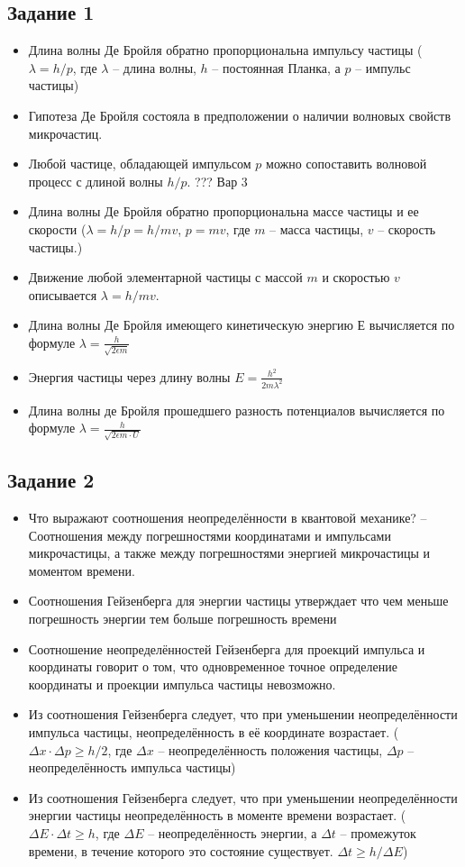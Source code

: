 \documentclass[../main.tex]{subfiles}
\begin{document}
\subsection{Задание 1}
\begin{itemize}
    \item Длина волны Де Бройля обратно пропорциональна импульсу частицы ($\lambda = h/p$, где $\lambda$ -- длина волны, $h$ -- постоянная Планка, а $p$ -- импульс частицы)
    \item Гипотеза Де Бройля состояла в предположении о наличии волновых свойств микрочастиц.
    \item Любой частице, обладающей импульсом $p$ можно сопоставить волновой процесс с длиной волны $h/p$. ??? Вар 3
    \item Длина волны Де Бройля обратно пропорциональна массе частицы и ее скорости ($\lambda = h/p = h/mv$, $p = mv$, где $m$ -- масса частицы, $v$ -- скорость частицы.)
    \item Движение любой элементарной частицы с массой $m$ и скоростью $v$ описывается $\lambda = h/mv$.
    \item Длина волны Де Бройля имеющего кинетическую энергию Е вычисляется по формуле $\lambda = \frac{h}{\sqrt{2 \epsilon m}}$
    \item Энергия частицы через длину волны $E = \frac{h^2}{2m \lambda^2}$
    \item Длина волны де Бройля прошедшего разность потенциалов вычисляется по формуле $\lambda = \frac{h}{\sqrt{2 \epsilon m \cdot U}}$
\end{itemize}

\subsection{Задание 2}
\begin{itemize}
    \item Что выражают соотношения неопределённости в квантовой механике? -- Соотношения между погрешностями координатами и импульсами микрочастицы, а также между погрешностями энергией микрочастицы и моментом времени.
    \item Соотношения Гейзенберга для энергии частицы утверждает что чем меньше погрешность энергии тем больше погрешность времени
    \item Соотношение неопределённостей Гейзенберга для проекций импульса и координаты говорит о том, что одновременное точное определение координаты и проекции импульса частицы невозможно.
    \item Из соотношения Гейзенберга следует, что при уменьшении неопределённости импульса частицы, неопределённость в её координате возрастает. ($\Delta x \cdot \Delta p \ge h/2$, где $\Delta x$ -- неопределённость положения частицы, $\Delta p$ -- неопределённость импульса частицы)
    \item Из соотношения Гейзенберга следует, что при уменьшении неопределённости энергии частицы неопределённость в моменте времени возрастает. ($\Delta E \cdot \Delta t \ge h$, где $\Delta E$ -- неопределённость энергии, а $\Delta t$ -- промежуток времени, в течение которого это состояние существует. $\Delta t \ge h/\Delta E$)
\end{itemize}
\end{document}
